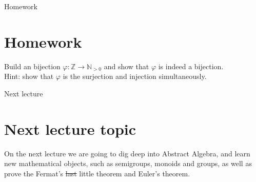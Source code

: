 \documentclass{beamer}
\begin{document}
\begin{frame}{Homework}
    \section{Homework}
    Build an bijection $\varphi : \mathbb{Z} \to \mathbb{N}_{>0}$ and show that $\varphi$ is indeed a bijection. \\ 
    Hint: show that $\varphi$ is the surjection and injection simultaneously.
\end{frame}

\begin{frame}{Next lecture}
    \section{Next lecture topic}
    On the next lecture we are going to dig deep into Abstract Algebra, and learn new mathematical objects, such as 
    semigroups, monoids and groups, as well as prove the Fermat's \st{last} little theorem and Euler's theorem.
\end{frame}
\end{document}
